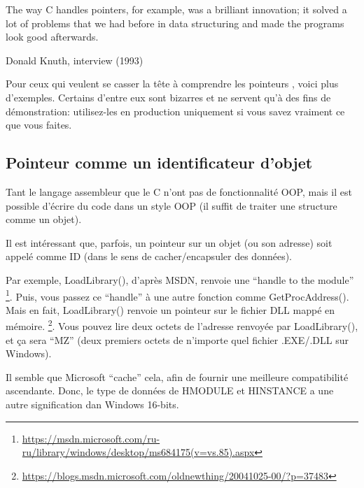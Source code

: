 \myindex{\CLanguageElements!\Pointers}
\label{label_pointers}

\epigraph{The way C handles pointers, for example, was a brilliant innovation;
it solved a lot of problems that we had before in data structuring and
made the programs look good afterwards.}{Donald Knuth, interview (1993)}

Pour ceux qui veulent se casser la tête à comprendre les pointeurs \CCpp, voici plus
d'exemples.
Certains d'entre eux sont bizarres et ne servent qu'à des fins de démonstration:
utilisez-les en production uniquement si vous savez vraiment ce que vous faites.








\subsection{Pointeur comme un identificateur d'objet}

Tant le langage assembleur que le C n'ont pas de fonctionnalité \ac{OOP}, mais il
est possible d'écrire du code dans un style \ac{OOP} (il suffit de traiter une structure
comme un objet).

Il est intéressant que, parfois, un pointeur sur un objet (ou son adresse) soit appelé
comme ID (dans le sens de cacher/encapsuler des données).

Par exemple, LoadLibrary(), d'après \ac{MSDN}, renvoie une ``handle to the module''
\footnote{\url{https://msdn.microsoft.com/ru-ru/library/windows/desktop/ms684175(v=vs.85).aspx}}.
Puis, vous passez ce ``handle'' à une autre fonction comme GetProcAddress().
Mais en fait, LoadLibrary() renvoie un pointeur sur le fichier DLL mappé en mémoire.
\footnote{\url{https://blogs.msdn.microsoft.com/oldnewthing/20041025-00/?p=37483}}.
Vous pouvez lire deux octets de l'adresse renvoyée par LoadLibrary(), et ça sera
``MZ'' (deux premiers octets de n'importe quel fichier .EXE/.DLL sur Windows).

Il semble que Microsoft ``cache'' cela, afin de fournir une meilleure compatibilité
ascendante. Donc, le type de données de HMODULE et HINSTANCE a une autre signification
dan Windows 16-bits.

